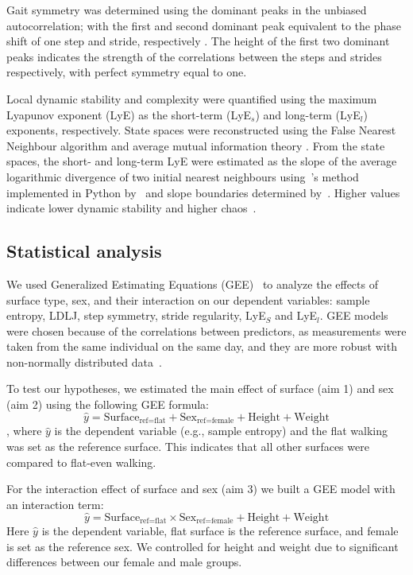 \documentclass[authoryear,preprint,review,12pt]{elsarticle}
\begin{document}
Gait symmetry was determined using the dominant peaks in the unbiased autocorrelation; with the first and second dominant peak equivalent to the phase shift of one step and stride, respectively \citep{moe2004estimation}. The height of the first two dominant peaks indicates the strength of the correlations between the steps and strides respectively, with perfect symmetry equal to one. 

Local dynamic stability and complexity were quantified using the maximum Lyapunov exponent (LyE) as the short-term (LyE$_{s}$) and long-term (LyE$_{l}$) exponents, respectively. 
State spaces were reconstructed using the False Nearest Neighbour algorithm and average mutual information theory \citep{stergiou_nonlinear_2016, sarwar_nonlinear_2023}. From the state spaces, the short- and long-term LyE were estimated as the slope of the average logarithmic divergence of two initial nearest neighbours using~\citet{rosenstein_practical_1993}'s method implemented in Python by~\citet{sarwar_nonlinear_2023} and slope boundaries determined by~\citet{bruijn2013assessing}. Higher values indicate lower dynamic stability and higher chaos~\citep{terrier2018maximum, bruijn2013assessing}. 

\subsection{Statistical analysis}
We used Generalized Estimating Equations (GEE)~\citep{ballinger2004using} to analyze the effects of surface type, sex, and their interaction on our dependent variables: sample entropy, LDLJ, step symmetry, stride regularity, LyE$_{S}$ and LyE$_{l}$. GEE models were chosen because of the correlations between predictors, as measurements were taken from the same individual on the same day, and they are more robust with non-normally distributed data~\citep{ballinger2004using}. 

To test our hypotheses, we estimated the main effect of surface (aim 1) and sex (aim 2) using the following GEE formula: 
\begin{equation}
    \hat{y} = \text{Surface}_{\text{ref=flat}} + \text{Sex}_{\text{ref=female}} + \text{Height} + \text{Weight}
\end{equation}
, where $\hat{y}$ is the dependent variable (e.g., sample entropy) and the flat walking was set as the reference surface. This indicates that all other surfaces were compared to flat-even walking. 

For the interaction effect of surface and sex (aim 3) we built a GEE model with an interaction term: 
\begin{equation}
    \hat{y} = \text{Surface}_{\text{ref=flat}} \times \text{Sex}_{\text{ref=female}} + \text{Height} + \text{Weight}
\end{equation}
Here $\hat{y}$ is the dependent variable, flat surface is the reference surface, and female is set as the reference sex. 
We controlled for height and weight due to significant differences between our female and male groups.
\end{document}
